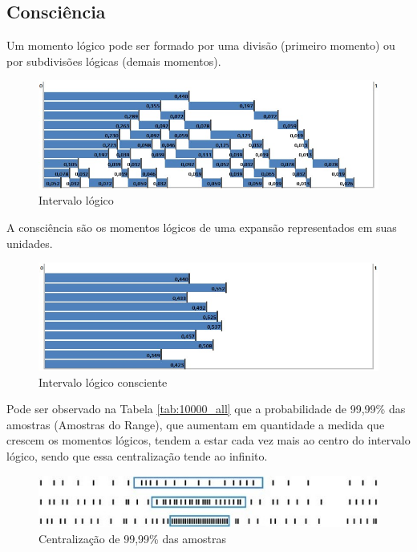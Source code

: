 \subsection{Consciência}
Um momento lógico pode ser formado por uma divisão (primeiro momento) ou por subdivisões lógicas (demais momentos).
	\begin{figure}[H]
	\caption{Intervalo lógico}
	\label{fig:consciousness_logical_moments}
	\centering
	\includegraphics[scale=.7]{sections/images/consciousness_logical_moments.jpg}
	\end{figure}

A consciência são os momentos lógicos de uma expansão representados em suas unidades.
	\begin{figure}[H]
	\caption{Intervalo lógico consciente}
	\label{fig:consciousness}
	\centering
	\includegraphics[scale=.7]{sections/images/consciousness.jpg}
	\end{figure}

Pode ser observado na Tabela \ref{tab:10000_all} que a probabilidade de 99,99\% das amostras (Amostras do Range), que aumentam em quantidade a medida que crescem os momentos lógicos, tendem a estar cada vez mais ao centro do intervalo lógico, sendo que essa centralização tende ao infinito.
	\begin{figure}[H]
	\caption{Centralização de 99,99\% das amostras}
	\label{fig:centering_of_99_range}
	\centering
	\includegraphics[scale=1]{sections/images/centering_of_99_range.jpg}
	\end{figure}

